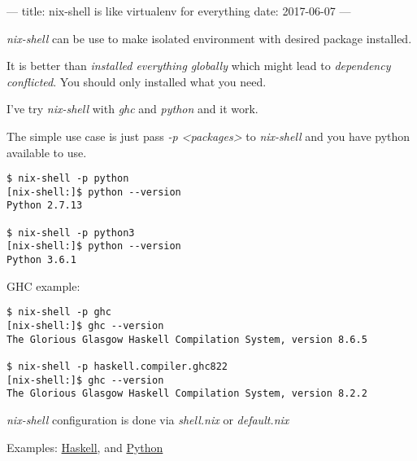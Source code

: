 ---
title: nix-shell is like virtualenv for everything
date: 2017-06-07
---


\textit{nix-shell} can be use to make isolated environment with desired package installed. 

It is better than \textit{installed everything globally} which might lead to \textit{dependency conflicted}.
You should only installed what you need.

I've try \textit{nix-shell} with \textit{ghc} and \textit{python} and it work.

The simple use case is just pass \textit{-p <packages>} to \textit{nix-shell} and you have python available to use.

\begin{verbatim}
$ nix-shell -p python
[nix-shell:]$ python --version
Python 2.7.13

$ nix-shell -p python3
[nix-shell:]$ python --version
Python 3.6.1
\end{verbatim}

GHC example:

\begin{verbatim}
$ nix-shell -p ghc
[nix-shell:]$ ghc --version
The Glorious Glasgow Haskell Compilation System, version 8.6.5

$ nix-shell -p haskell.compiler.ghc822
[nix-shell:]$ ghc --version
The Glorious Glasgow Haskell Compilation System, version 8.2.2

\end{verbatim}


\textit{nix-shell} configuration is done via \textit{shell.nix} or \textit{default.nix}

Examples: \href{../nix-vim-haskell}{Haskell}, and \href{../nix-vim-python}{Python}




